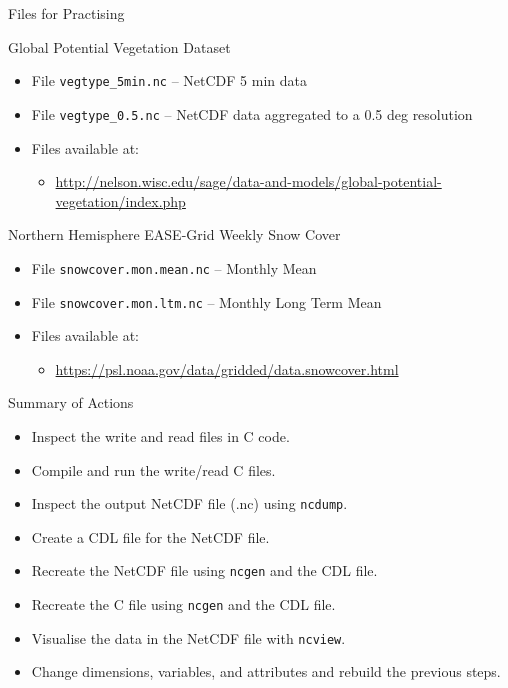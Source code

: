 \documentclass[compress,11pt,xcolor=svgnames,aspectratio=169]{beamer}
\begin{document}
\begin{frame}[fragile]{Files for Practising}

Global Potential Vegetation Dataset

    \begin{itemize}
    \setlength\itemsep{0.2cm}
      \item File \verb|vegtype_5min.nc| -- NetCDF 5 min data
      \item File \verb|vegtype_0.5.nc| -- NetCDF data aggregated to a 0.5 deg resolution
      \item Files available at:
        \begin{itemize}
          \item {\scriptsize \url{http://nelson.wisc.edu/sage/data-and-models/global-potential-vegetation/index.php}}
        \end{itemize}
    \end{itemize}

\vspace*{0.3cm}

Northern Hemisphere EASE-Grid Weekly Snow Cover

    \begin{itemize}
    \setlength\itemsep{0.2cm}
      \item File \verb|snowcover.mon.mean.nc| -- Monthly Mean
      \item File \verb|snowcover.mon.ltm.nc|	-- Monthly Long Term Mean
      \item Files available at:
        \begin{itemize}
          \item {\scriptsize \url{https://psl.noaa.gov/data/gridded/data.snowcover.html}}
        \end{itemize}
    \end{itemize}

\end{frame}

\begin{frame}[fragile]{Summary of Actions}

\begin{itemize}
\setlength\itemsep{0.3cm}

  \item Inspect the write and read files in C code.
  \item Compile and run the write/read C files.
  \item Inspect the output NetCDF file (.nc) using \texttt{ncdump}.
  \item Create a CDL file for the NetCDF file.
  \item Recreate the NetCDF file using \texttt{ncgen} and the CDL file.
  \item Recreate the C file using \texttt{ncgen} and the CDL file.
  \item Visualise the data in the NetCDF file with \texttt{ncview}.
  \item Change dimensions, variables, and attributes and rebuild the previous steps.

\end{itemize}

\end{frame}
\end{document}
